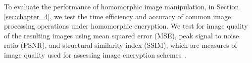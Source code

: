 To evaluate the performance of homomorphic image manipulation, in Section \ref{sec:chapter_4}, we test the time efficiency and accuracy of common image processing operations under homomorphic encryption. We test for image quality of the resulting images using mean squared error (MSE), peak signal to noise ratio (PSNR), and structural similarity index (SSIM), which are measures of image quality used for assessing image encryption schemes~\cite{ahmed_benchmark_2016}.





